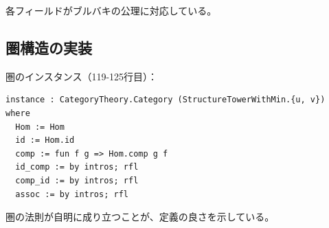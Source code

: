 \documentclass[a4paper,12pt]{ltjsarticle}
\theoremstyle{definition}
\begin{document}
各フィールドがブルバキの公理に対応している。

\subsection{圏構造の実装}

圏のインスタンス（119-125行目）：
\begin{verbatim}
instance : CategoryTheory.Category (StructureTowerWithMin.{u, v}) where
  Hom := Hom
  id := Hom.id
  comp := fun f g => Hom.comp g f
  id_comp := by intros; rfl
  comp_id := by intros; rfl
  assoc := by intros; rfl
\end{verbatim}

圏の法則が自明に成り立つことが、定義の良さを示している。
\end{document}
